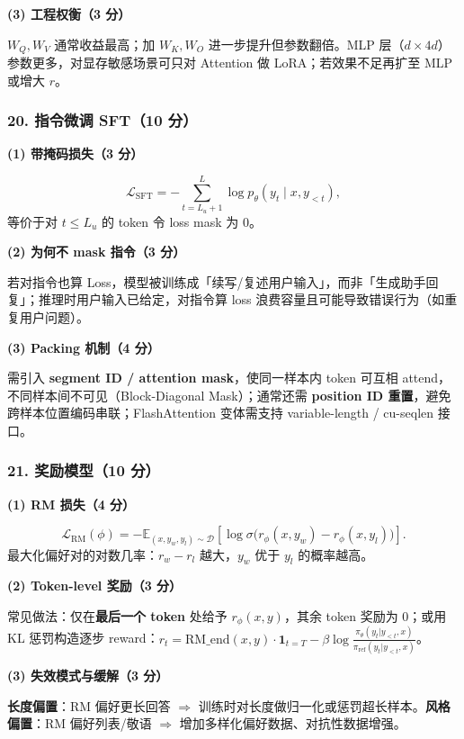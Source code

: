 \documentclass[11pt,a4paper]{article}
\begin{document}
\noindent\textbf{(3) 工程权衡（3 分）}

$W_Q,W_V$ 通常收益最高；加 $W_K,W_O$ 进一步提升但参数翻倍。MLP 层（$d\times4d$）参数更多，对显存敏感场景可只对 Attention 做 LoRA；若效果不足再扩至 MLP 或增大 $r$。

\subsubsection*{20. 指令微调 SFT（10 分）}

\noindent\textbf{(1) 带掩码损失（3 分）}

\[
\mathcal{L}_{\mathrm{SFT}}=-\sum_{t=L_u+1}^{L}\log p_\theta(y_t\mid x,y_{<t}),
\]
等价于对 $t\le L_u$ 的 token 令 loss mask 为 0。

\noindent\textbf{(2) 为何不 mask 指令（3 分）}

若对指令也算 Loss，模型被训练成「续写/复述用户输入」，而非「生成助手回复」；推理时用户输入已给定，对指令算 loss 浪费容量且可能导致错误行为（如重复用户问题）。

\noindent\textbf{(3) Packing 机制（4 分）}

需引入 \textbf{segment ID / attention mask}，使同一样本内 token 可互相 attend，不同样本间不可见（Block-Diagonal Mask）；通常还需 \textbf{position ID 重置}，避免跨样本位置编码串联；FlashAttention 变体需支持 variable-length / cu-seqlen 接口。

\subsubsection*{21. 奖励模型（10 分）}

\noindent\textbf{(1) RM 损失（4 分）}

\[
\mathcal{L}_{\mathrm{RM}}(\phi)=-\mathbb{E}_{(x,y_w,y_l)\sim\mathcal{D}}\!\left[\log\sigma\!\big(r_\phi(x,y_w)-r_\phi(x,y_l)\big)\right].
\]
最大化偏好对的对数几率：$r_w-r_l$ 越大，$y_w$ 优于 $y_l$ 的概率越高。

\noindent\textbf{(2) Token-level 奖励（3 分）}

常见做法：仅在\textbf{最后一个 token} 处给予 $r_\phi(x,y)$，其余 token 奖励为 0；或用 KL 惩罚构造逐步 reward：$r_t=\mathrm{RM\_end}(x,y)\cdot\mathbf{1}_{t=T}-\beta\log\frac{\pi_\theta(y_t|y_{<t},x)}{\pi_{\mathrm{ref}}(y_t|y_{<t},x)}$。

\noindent\textbf{(3) 失效模式与缓解（3 分）}

\textbf{长度偏置}：RM 偏好更长回答 $\Rightarrow$ 训练时对长度做归一化或惩罚超长样本。\textbf{风格偏置}：RM 偏好列表/敬语 $\Rightarrow$ 增加多样化偏好数据、对抗性数据增强。
\end{document}
